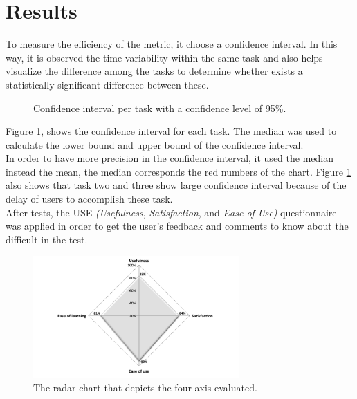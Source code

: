 \section{Results}

To measure the efficiency of the metric, it choose a confidence
interval. In this way, it is observed the time variability within the
same task and also helps visualize the difference among the tasks to
determine whether exists a statistically significant difference
between these. \\
\begin{figure}
\centering
\captionsetup{font=footnotesize}
\caption{Confidence interval per task with a confidence level of 95\%.}
\label{fig:ci95}   
\end{figure}
Figure  \ref{fig:ci95}, shows the confidence interval for each task.
The median was used to calculate the  lower bound and upper bound of
the confidence interval. \\In  order to have more precision in the
confidence interval, it used the median instead the mean, the median
corresponds the red numbers of the chart. Figure  \ref{fig:ci95} also 
shows that task two and three show large confidence interval because of  
the delay of users to accomplish these task. \\ 
After tests, the USE \textit{(Usefulness}, \textit{Satisfaction}, and 
\textit{Ease of Use)} questionnaire  \cite{morris2001experience} 
was applied in order to get the user's feedback and comments 
to know about the difficult in the test.  
\begin{figure}
\centering
\small
\captionsetup{font=footnotesize}
\includegraphics[width=0.7\textwidth]{img/radial.png}
\caption{\small{The radar chart that depicts the four axis 
evaluated.}}
\label{fig:radial}   
\end{figure}
